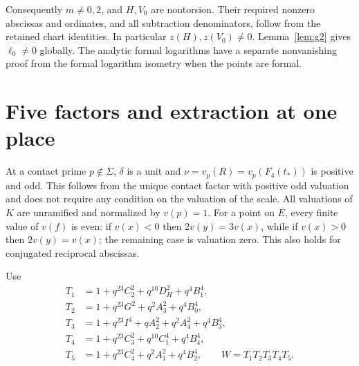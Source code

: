 \documentclass[11pt,a4paper]{article}
\begin{document}
Consequently $m\ne0,2$, and $H,V_0$ are nontorsion. Their required
nonzero abscissas and ordinates, and all subtraction denominators,
follow from the retained chart identities. In particular
$z(H),z(V_0)\ne0$. Lemma~\ref{lem:g2} gives $\ell_0\ne0$ globally.
The analytic formal logarithms have a separate nonvanishing proof
from the formal logarithm isometry when the points are formal.

\section{Five factors and extraction at one place}
At a contact prime $p\notin\Sigma$, $\delta$ is a unit and
$\nu=v_p(R)=v_p(F_4(t_*))$ is positive and odd. This follows
from the unique contact factor with positive odd valuation and
does not require any condition on the valuation of the scale. All valuations
of $K$ are unramified and normalized by $v(p)=1$.
For a point on $E$, every finite value of $v(f)$ is even: if
$v(x)<0$ then $2v(y)=3v(x)$, while if $v(x)>0$ then
$2v(y)=v(x)$; the remaining case is valuation zero.
This also holds for conjugated reciprocal abscissas.

Use
\begin{align*}
 T_1&=1+q^{23}C_2^2+q^{10}D_H^2+q^4B_1^4,\\
 T_2&=1+q^{23}G^2+q^2A_3^2+q^4B_0^4,\\
 T_3&=1+q^{23}I^4+qA_2^2+q^2A_4^2+q^4B_3^4,\\
 T_4&=1+q^{23}C_3^2+q^{10}C_1^4+q^4B_4^4,\\
 T_5&=1+q^{23}C_4^2+q^2A_1^2+q^4B_2^4,
 \qquad W=T_1T_2T_3T_4T_5.
\end{align*}
\end{document}

